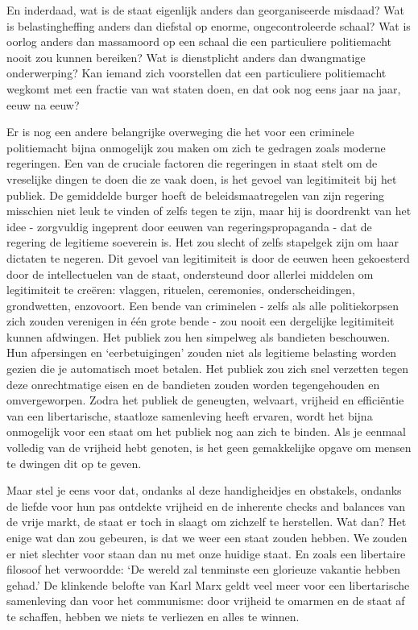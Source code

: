 \documentclass[
  a5paper,
  smalldemyvopaper,10pt,twoside,onecolumn,openright,extrafontsizes,hidelinks]{memoir}
\begin{document}
En inderdaad, wat is de staat eigenlijk anders dan georganiseerde
misdaad? Wat is belastingheffing anders dan diefstal op enorme,
ongecontroleerde schaal? Wat is oorlog anders dan massamoord op een
schaal die een particuliere politiemacht nooit zou kunnen bereiken? Wat
is dienstplicht anders dan dwangmatige onderwerping? Kan iemand zich
voorstellen dat een particuliere politiemacht wegkomt met een fractie
van wat staten doen, en dat ook nog eens jaar na jaar, eeuw na eeuw?

Er is nog een andere belangrijke overweging die het voor een criminele
politiemacht bijna onmogelijk zou maken om zich te gedragen zoals
moderne regeringen. Een van de cruciale factoren die regeringen in staat
stelt om de vreselijke dingen te doen die ze vaak doen, is het gevoel
van legitimiteit bij het publiek. De gemiddelde burger hoeft de
beleidsmaatregelen van zijn regering misschien niet leuk te vinden of
zelfs tegen te zijn, maar hij is doordrenkt van het idee - zorgvuldig
ingeprent door eeuwen van regeringspropaganda - dat de regering de
legitieme soeverein is. Het zou slecht of zelfs stapelgek zijn om haar
dictaten te negeren. Dit gevoel van legitimiteit is door de eeuwen heen
gekoesterd door de intellectuelen van de staat, ondersteund door
allerlei middelen om legitimiteit te creëren: vlaggen, rituelen,
ceremonies, onderscheidingen, grondwetten, enzovoort. Een bende van
criminelen - zelfs als alle politiekorpsen zich zouden verenigen in één
grote bende - zou nooit een dergelijke legitimiteit kunnen afdwingen.
Het publiek zou hen simpelweg als bandieten beschouwen. Hun afpersingen
en `eerbetuigingen' zouden niet als legitieme belasting worden gezien
die je automatisch moet betalen. Het publiek zou zich snel verzetten
tegen deze onrechtmatige eisen en de bandieten zouden worden
tegengehouden en omvergeworpen. Zodra het publiek de geneugten,
welvaart, vrijheid en efficiëntie van een libertarische, staatloze
samenleving heeft ervaren, wordt het bijna onmogelijk voor een staat om
het publiek nog aan zich te binden. Als je eenmaal volledig van de
vrijheid hebt genoten, is het geen gemakkelijke opgave om mensen te
dwingen dit op te geven.

Maar stel je eens voor dat, ondanks al deze handigheidjes en obstakels,
ondanks de liefde voor hun pas ontdekte vrijheid en de inherente checks
and balances van de vrije markt, de staat er toch in slaagt om zichzelf
te herstellen. Wat dan? Het enige wat dan zou gebeuren, is dat we weer
een staat zouden hebben. We zouden er niet slechter voor staan dan nu
met onze huidige staat. En zoals een libertaire filosoof het verwoordde:
`De wereld zal tenminste een glorieuze vakantie hebben gehad.' De
klinkende belofte van Karl Marx geldt veel meer voor een libertarische
samenleving dan voor het communisme: door vrijheid te omarmen en de
staat af te schaffen, hebben we niets te verliezen en alles te winnen.
\end{document}
